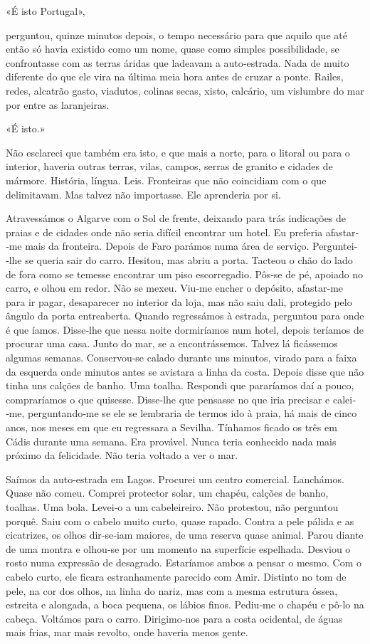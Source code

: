 «É isto Portugal»,

perguntou, quinze minutos depois, o tempo necessário para que aquilo que
até então só havia existido como um nome, quase como simples
possibilidade, se confrontasse com as terras áridas que ladeavam a
auto­‑estrada. Nada de muito diferente do que ele vira na última meia
hora antes de cruzar a ponte. Railes, redes, alcatrão gasto, viadutos,
colinas secas, xisto, calcário, um vislumbre do mar por entre as
laranjeiras.

«É isto.»

Não esclareci que também era isto, e que mais a norte, para o litoral ou
para o interior, haveria outras terras, vilas, campos, serras de granito
e cidades de mármore. História, língua. Leis. Fronteiras que não
coincidiam com o que delimitavam. Mas talvez não importasse. Ele
aprenderia por si.

Atravessámos o Algarve com o Sol de frente, deixando para trás
indicações de praias e de cidades onde não seria difícil encontrar um
hotel. Eu preferia afastar­‑me mais da fronteira. Depois de Faro parámos
numa área de serviço. Perguntei­‑lhe se queria sair do carro. Hesitou,
mas abriu a porta. Tacteou o chão do lado de fora como se temesse
encontrar um piso escorregadio. Pôs­‑se de pé, apoiado no carro, e olhou
em redor. Não se mexeu. Viu­‑me encher o depósito, afastar­‑me para ir
pagar, desaparecer no interior da loja, mas não saiu dali, protegido
pelo ângulo da porta entreaberta. Quando regressámos à estrada,
perguntou para onde é que íamos. Disse­‑lhe que nessa noite dormiríamos
num hotel, depois teríamos de procurar uma casa. Junto do mar, se a
encontrássemos. Talvez lá ficássemos algumas semanas. Conservou­‑se
calado durante uns minutos, virado para a faixa da esquerda onde minutos
antes se avistara a linha da costa. Depois disse que não tinha uns
calções de banho. Uma toalha. Respondi que pararíamos daí a pouco,
compraríamos o que quisesse. Disse­‑lhe que pensasse no que iria
precisar e calei­‑me, perguntando­‑me se ele se lembraria de termos ido
à praia, há mais de cinco anos, nos meses em que eu regressara a
Sevilha. Tínhamos ficado os três em Cádis durante uma semana. Era
provável. Nunca teria conhecido nada mais próximo da felicidade. Não
teria voltado a ver o mar.

Saímos da auto­‑estrada em Lagos. Procurei um centro comercial.
Lanchámos. Quase não comeu. Comprei protector solar, um chapéu, calções
de banho, toalhas. Uma bola. Levei­‑o a um cabeleireiro. Não protestou,
não perguntou porquê. Saiu com o cabelo muito curto, quase rapado.
Contra a pele pálida e as cicatrizes, os olhos dir­‑se­‑iam maiores, de
uma reserva quase animal. Parou diante de uma montra e olhou­‑se por um
momento na superfície espelhada. Desviou o rosto numa expressão de
desagrado. Estaríamos ambos a pensar o mesmo. Com o cabelo curto, ele
ficara estranhamente parecido com Amir. Distinto no tom de pele, na cor
dos olhos, na linha do nariz, mas com a mesma estrutura óssea, estreita
e alongada, a boca pequena, os lábios finos. Pediu­‑me o chapéu e pô­‑lo
na cabeça. Voltámos para o carro. Dirigimo­‑nos para a costa ocidental,
de águas mais frias, mar mais revolto, onde haveria menos gente.


